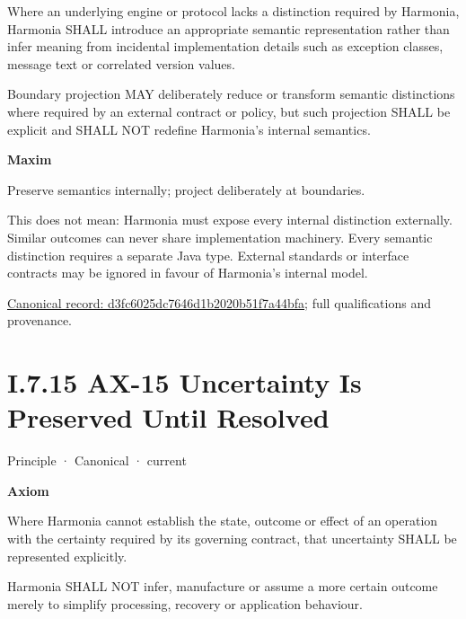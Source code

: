 Where an underlying engine or protocol lacks a distinction required by Harmonia, Harmonia SHALL introduce an appropriate semantic representation rather than infer meaning from incidental implementation details such as exception classes, message text or correlated version values.



Boundary projection MAY deliberately reduce or transform semantic distinctions where required by an external contract or policy, but such projection SHALL be explicit and SHALL NOT redefine Harmonia's internal semantics.



\par\medskip\textbf{Maxim}\par


Preserve semantics internally; project deliberately at boundaries.



This does not mean: Harmonia must expose every internal distinction externally. Similar outcomes can never share implementation machinery. Every semantic distinction requires a separate Java type. External standards or interface contracts may be ignored in favour of Harmonia's internal model.


{\footnotesize \href{../../../../../../../continuum/motivation/principle/d3fc6025dc7646d1b2020b51f7a44bfa.md}{Canonical record: d3fc6025dc7646d1b2020b51f7a44bfa}; full qualifications and provenance.}\par
\section*{I.7.15 AX-15 Uncertainty Is Preserved Until Resolved}
\label{navigation:I.7.15}

\label{element:ef8abbaec37e4890ad78b9f263e67906}
{\small Principle · Canonical · current}\par

\par\medskip\textbf{Axiom}\par


Where Harmonia cannot establish the state, outcome or effect of an operation with the certainty required by its governing contract, that uncertainty SHALL be represented explicitly.



Harmonia SHALL NOT infer, manufacture or assume a more certain outcome merely to simplify processing, recovery or application behaviour.




